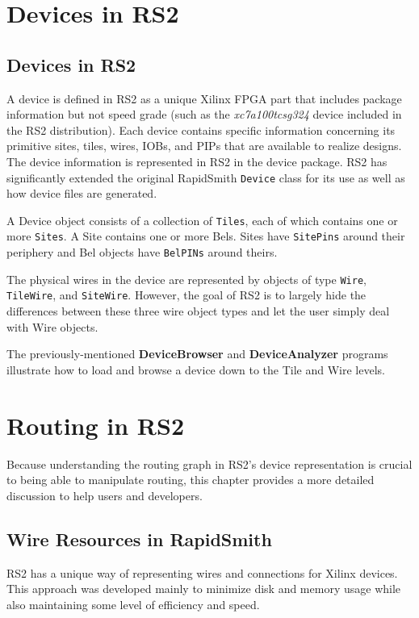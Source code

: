 \documentclass[12pt]{article}
\newcommand{\cls}[1]{{\texttt{#1}}}
\newcommand{\pgm}[1]{{\textbf{#1}}}
\begin{document}
\section{Devices in RS2}

\subsection{Devices in RS2}
A device is defined in RS2 as a unique Xilinx FPGA part that includes package
information but not speed grade (such as the {\em xc7a100tcsg324} device
included in the RS2 distribution).  Each device contains specific information concerning its
primitive sites, tiles, wires, IOBs, and PIPs that are available to realize
designs.  The device information is represented in RS2 in the device package. 
RS2 has significantly extended the original RapidSmith \cls{Device} class for
its use as well as how device files are generated.

A Device object consists of a collection of \cls{Tiles}, each of which contains
one or more \cls{Sites}.  A Site contains one or more Bels.  Sites have
\cls{SitePins} around their periphery and Bel objects have \cls{BelPINs} around
theirs.

The physical wires in the device are represented by objects of type \cls{Wire},
\cls{TileWire}, and \cls{SiteWire}.  However, the goal of RS2 is to largely hide
the differences between these three wire object types and let the user simply deal
with Wire objects.

The previously-mentioned \pgm{DeviceBrowser} and \pgm{DeviceAnalyzer} programs
illustrate how to load and browse a device down to the Tile and Wire levels.

\section{Routing in RS2}
Because understanding the routing graph in RS2’s device representation is
crucial to being able to manipulate routing, this chapter provides a more
detailed discussion to help users and developers.

\subsection{Wire Resources in RapidSmith}
RS2 has a unique way of representing wires and connections for Xilinx devices. 
This approach was developed mainly to minimize disk and memory usage while also
maintaining some level of efficiency and speed.
\end{document}

